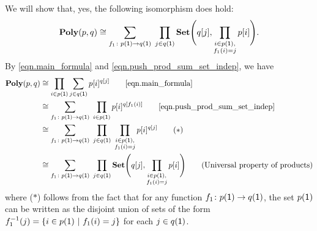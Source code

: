 \documentclass[Book-Poly]{subfiles}
\begin{document}
\begin{exercise}
\begin{solution}
\begin{longenum}
\item We will show that, yes, the following isomorphism does hold:
\[
	\mathbf{Poly}(p,q) \cong \sum_{f_1\colon p(\textsf{1})\to q(\textsf{1})} \; \prod_{j\in q(\textsf{1})}\mathbf{Set}\Bigg(q[j],\prod_{\substack{i \in p(\textsf{1}), \\ f_1(i) = j}}p[i]\Bigg).
\]
By \eqref{eqn.main_formula} and \eqref{eqn.push_prod_sum_set_indep}, we have
\begin{align*}
    \poly(p, q) &\iso \prod_{i \in p(\1)} \sum_{j \in q(\1)} p[i]^{q[j]} \tag*{\eqref{eqn.main_formula}} \\
    &\iso \sum_{f_1 \colon p(\1) \to q(\1)} \; \prod_{i \in p(\1)} p[i]^{q[f_1(i)]} \tag*{\eqref{eqn.push_prod_sum_set_indep}} \\
    &\iso \sum_{f_1 \colon p(\1) \to q(\1)} \; \prod_{j \in q(\1)} \; \prod_{\substack{i \in p(\1), \\ f_1(i) = j}} p[i]^{q[j]} \tag{$\ast$} \\
    &\iso \sum_{f_1\colon p(\1)\to q(\1)} \; \prod_{j\in q(\1)}\smset\Bigg(q[j],\prod_{\substack{i \in p(\1), \\ f_1(i) = j}}p[i]\Bigg) \tag{Universal property of products}
\end{align*}
where ($\ast$) follows from the fact that for any function $f_1 \colon p(\textsf{1}) \to q(\textsf{1})$, the set $p(\textsf{1})$ can be written as the disjoint union of sets of the form $f_1^{-1}(j) = \{i \in p(1) \ | \ f_1(i) = j\}$ for each $j \in q(\textsf{1})$.


\end{longenum}
\end{solution}
\end{exercise}
\end{document}
